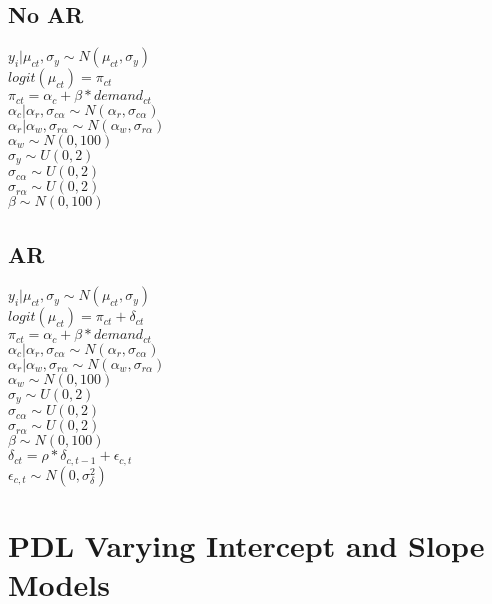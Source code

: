 \documentclass[12pt]{article}
\begin{document}
\subsection{No AR}
$ y_i|\mu_{ct},\sigma_y \sim N(\mu_{ct}, \sigma_y) $ \\
$ logit(\mu_{ct})=  \pi_{ct} $\\
$ \pi_{ct} = \alpha_c + \beta*demand_{ct} $\\
$ \alpha_c|\alpha_r,\sigma_{c\alpha} \sim N(\alpha_r,\sigma_{c\alpha}) $ \\
$ \alpha_r|\alpha_w,\sigma_{r\alpha} \sim N(\alpha_w, \sigma_{r\alpha}) $\\
$ \alpha_w \sim N(0, 100) $\\

\noindent
 $ \sigma_y \sim U(0,2) $ \\
 $ \sigma_{c\alpha} \sim U(0,2) $ \\
 $ \sigma_{r\alpha}\sim U(0,2) $ \\
 $ \beta \sim N(0,100) $ \\

\subsection{AR}
 $ y_i|\mu_{ct},\sigma_y \sim N(\mu_{ct}, \sigma_y) $ \\
 $ logit(\mu_{ct})=  \pi_{ct} + \delta_{ct} $\\
 $ \pi_{ct} = \alpha_c + \beta*demand_{ct} $\\
 $ \alpha_c|\alpha_r,\sigma_{c\alpha} \sim N(\alpha_r,\sigma_{c\alpha}) $ \\
 $ \alpha_r|\alpha_w,\sigma_{r\alpha} \sim N(\alpha_w, \sigma_{r\alpha}) $\\
 $ \alpha_w \sim N(0, 100) $\\

\noindent
 $ \sigma_y \sim U(0,2) $ \\
 $ \sigma_{c\alpha} \sim U(0,2) $ \\
 $ \sigma_{r\alpha}\sim U(0,2) $ \\
 $ \beta \sim N(0,100) $ \\

\noindent
 $ \delta_{ct} = \rho*\delta_{c,t-1}+\epsilon_{c,t} $ \\
 $ \epsilon_{c,t} \sim N(0,\sigma^2_\delta) $ \\
\newpage
\section{PDL Varying Intercept and Slope Models}
\end{document}
